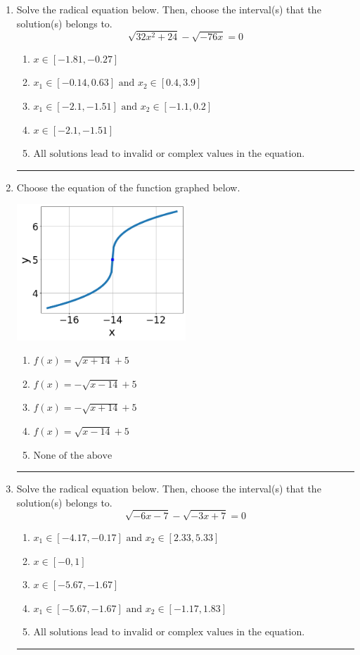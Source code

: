 \documentclass[14pt]{extbook}
\newcommand{\litem}[1]{\item#1\hspace*{-1cm}\rule{\textwidth}{0.4pt}}
\begin{document}
\begin{enumerate}
{\begin{enumerate}[label=\Alph*.]
\end{enumerate} }
\litem{
Solve the radical equation below. Then, choose the interval(s) that the solution(s) belongs to.\[ \sqrt{32 x^2 + 24} - \sqrt{-76 x} = 0 \]\begin{enumerate}[label=\Alph*.]
\item \( x \in [-1.81,-0.27] \)
\item \( x_1 \in [-0.14, 0.63] \text{ and } x_2 \in [0.4,3.9] \)
\item \( x_1 \in [-2.1, -1.51] \text{ and } x_2 \in [-1.1,0.2] \)
\item \( x \in [-2.1,-1.51] \)
\item \( \text{All solutions lead to invalid or complex values in the equation.} \)

\end{enumerate} }
\litem{
Choose the equation of the function graphed below.
\begin{center}
    \includegraphics[width=0.5\textwidth]{../Figures/radicalGraphToEquationCopyB.png}
\end{center}
\begin{enumerate}[label=\Alph*.]
\item \( f(x) = \sqrt{x + 14} + 5 \)
\item \( f(x) = - \sqrt{x - 14} + 5 \)
\item \( f(x) = - \sqrt{x + 14} + 5 \)
\item \( f(x) = \sqrt{x - 14} + 5 \)
\item \( \text{None of the above} \)

\end{enumerate} }
\litem{
Solve the radical equation below. Then, choose the interval(s) that the solution(s) belongs to.\[ \sqrt{-6 x - 7} - \sqrt{-3 x + 7} = 0 \]\begin{enumerate}[label=\Alph*.]
\item \( x_1 \in [-4.17, -0.17] \text{ and } x_2 \in [2.33,5.33] \)
\item \( x \in [-0,1] \)
\item \( x \in [-5.67,-1.67] \)
\item \( x_1 \in [-5.67, -1.67] \text{ and } x_2 \in [-1.17,1.83] \)
\item \( \text{All solutions lead to invalid or complex values in the equation.} \)


\end{enumerate}}
\end{enumerate}
\end{document}

